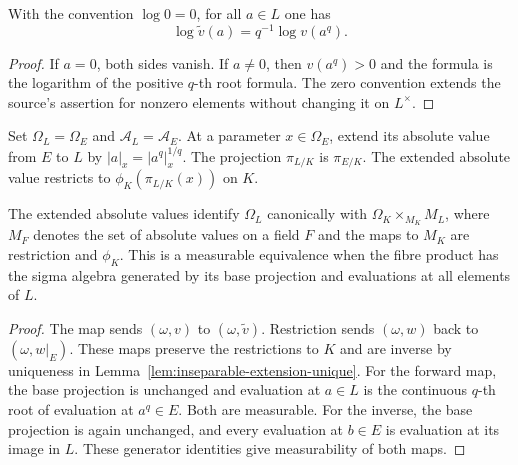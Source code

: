 \begin{lemma}
\label{lem:inseparable-log}
\leanok
{}
With the convention $\log0=0$, for all $a\in L$ one has
\[
 \log\widetilde v(a)=q^{-1}\log v(a^q).
\]
\end{lemma}
\begin{proof}
If $a=0$, both sides vanish. If $a\ne0$, then $v(a^q)>0$ and
the formula is the logarithm of the positive $q$-th root formula.
The zero convention extends the source's assertion for nonzero
elements without changing it on $L^\times$.
\end{proof}

\begin{definition}
\label{def:finite-parameters}
\leanok
{}
Set $\Omega_L=\Omega_E$ and $\mathcal A_L=\mathcal A_E$. At a parameter
$x\in\Omega_E$, extend its absolute value from $E$ to $L$ by
$|a|_x=|a^q|_x^{1/q}$. The projection $\pi_{L/K}$ is $\pi_{E/K}$.
The extended absolute value restricts to $\phi_K(\pi_{L/K}(x))$ on $K$.
\end{definition}

\begin{lemma}
\label{lem:finite-parameter-identification}
\leanok
{}
The extended absolute values identify $\Omega_L$ canonically with
$\Omega_K\times_{M_K}M_L$, where $M_F$ denotes the set of absolute
values on a field $F$ and the maps to $M_K$ are restriction and
$\phi_K$. This is a measurable equivalence when the fibre product
has the sigma algebra generated by its base projection and evaluations
at all elements of $L$.
\end{lemma}
\begin{proof}
The map sends $(\omega,v)$ to $(\omega,\widetilde v)$.
Restriction sends $(\omega,w)$ back to $(\omega,w|_E)$.
These maps preserve the restrictions to $K$ and are inverse by
uniqueness in Lemma~\ref{lem:inseparable-extension-unique}.
For the forward map, the base projection is unchanged and evaluation
at $a\in L$ is the continuous $q$-th root of evaluation at $a^q\in E$.
Both are measurable. For the inverse, the base projection is again
unchanged, and every evaluation at $b\in E$ is evaluation at its
image in $L$. These generator identities give measurability of both maps.
\end{proof}

